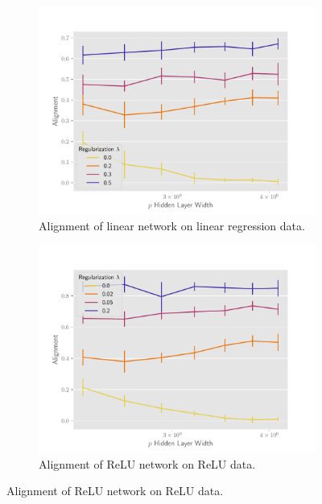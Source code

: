 \begin{figure}[h]
\centering

\begin{subfigure}[b]{.49\textwidth}
  \centering
  \includegraphics[width=\linewidth]{figures/align_lr_non_autograd_l2_v3.pdf}
  \caption{Alignment of linear network on linear regression data.}
  \label{fig:align_lr_non_autograd_l2}
\end{subfigure}\hfill
\begin{subfigure}[b]{.49\textwidth}
  \centering
  \includegraphics[width=\linewidth]{figures/align_nn_relu_autograd_l2_v4.pdf}
  \caption{Alignment of ReLU network on ReLU data.}
  \label{fig:align_nn_relu_autograd_l2}
\end{subfigure}


\end{figure}
